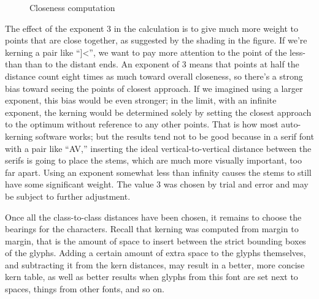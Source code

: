 \documentclass[14pt]{extarticle}
\begin{document}
\begin{figure}
\centering
{}
\caption{Closeness computation}
\label{fig:kernclose}
\end{figure}

The effect of the exponent 3 in the calculation is to give much more weight
to points that are close together, as suggested by the shading in the
figure.  If we're kerning a pair like ``]<'', we want to pay more attention
to the point of the less-than than to the distant ends.  An exponent of 3
means that points at half the distance count eight times as much toward
overall closeness, so there's a strong bias toward seeing the points of
closest approach.  If we imagined using a larger exponent, this bias would
be even stronger; in the limit, with an infinite exponent, the kerning would
be determined solely by setting the closest approach to the optimum without
reference to any other points.  That is how most auto-kerning software
works; but the results tend not to be good because in a serif font with a
pair like {``AV,''} inserting the ideal
vertical-to-vertical distance between the serifs is going to place the
stems, which are much more visually important, too far apart.  Using an
exponent somewhat less than infinity causes the stems to still have some
significant weight.  The value 3 was chosen by trial and error and may be
subject to further adjustment.

Once all the class-to-class distances have been chosen, it remains to choose
the bearings for the characters.  Recall that kerning was computed from
margin to margin, that is the amount of space to insert between the strict
bounding boxes of the glyphs.  Adding a certain amount of extra space to the
glyphs themselves, and subtracting it from the kern distances, may result in
a better, more concise kern table, as well as better results when glyphs
from this font are set next to spaces, things from other fonts, and so on.
\end{document}
